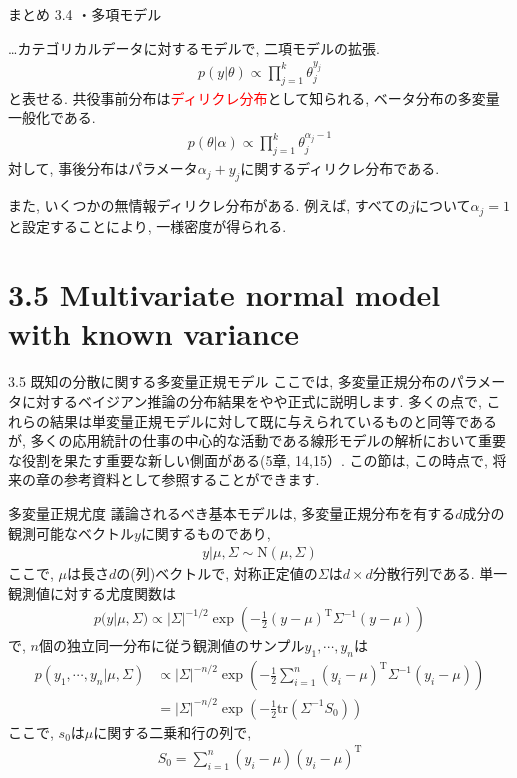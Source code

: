 \documentclass[10pt,dvipdfmx,a4]{beamer}
\newcommand{\eq}[1]{\begin{align}#1\end{align}}
\newcommand{\eqn}[1]{\begin{align*}#1\end{align*}}
\newcommand{\tcr}[1]{\textcolor{red}{#1}}
\begin{document}
\begin{frame}[t]{まとめ 3.4}
・多項モデル

…カテゴリカルデータに対するモデルで, 二項モデルの拡張.
\eqn{p(y|\theta)\propto\prod_{j=1}^k \theta_j^{y_j}}
と表せる.
共役事前分布は\tcr{ディリクレ分布}として知られる, ベータ分布の多変量一般化である.
\eqn{p(\theta|\alpha)\propto \prod_{j=1}^k\theta_j^{\alpha_j-1}}
対して, 事後分布はパラメータ$\alpha_j+y_j$に関するディリクレ分布である.

また, いくつかの無情報ディリクレ分布がある.
例えば, すべての$j$について$\alpha_j= 1$と設定することにより, 一様密度が得られる.
\end{frame}

\section{3.5 Multivariate normal model with known variance}
\begin{frame}{3.5 既知の分散に関する多変量正規モデル}
ここでは, 多変量正規分布のパラメータに対するベイジアン推論の分布結果をやや正式に説明します.
多くの点で, これらの結果は単変量正規モデルに対して既に与えられているものと同等であるが, 多くの応用統計の仕事の中心的な活動である線形モデルの解析において重要な役割を果たす重要な新しい側面がある(5章, 14,15）.
この節は, この時点で, 将来の章の参考資料として参照することができます.
\end{frame}


\begin{frame}{多変量正規尤度}
議論されるべき基本モデルは, 多変量正規分布を有する$d$成分の観測可能なベクトル$y$に関するものであり,
\eq{y|\mu, \Sigma\sim\text{N}(\mu,\Sigma)}
ここで, $\mu$は長さ$d$の(列)ベクトルで, 対称正定値の$\Sigma$は$d\times d$分散行列である.
単一観測値に対する尤度関数は
\eqn{p(y|\mu,\Sigma)\propto |\Sigma|^{-1/2}\exp \left(-\tfrac{1}{2}(y-\mu)^{\mathrm{T}}\Sigma^{-1}(y-\mu)\right)}
で, $n$個の独立同一分布に従う観測値のサンプル$y_1,\cdots,y_n$は
\eq{p(y_1,\cdots,y_n|\mu,\Sigma)&\propto|\Sigma|^{-n/2} \exp\left(-\tfrac{1}{2}\sum_{i=1}^n(y_i-\mu)^{\mathrm{T}}\Sigma^{-1}(y_i-\mu)\right)\nonumber\\
&=|\Sigma|^{-n/2}\exp \left(-\tfrac{1}{2}\text{tr}(\Sigma^{-1}S_0)\right)}
ここで, $s_0$は$\mu$に関する二乗和行の列で,
\eq{S_0=\sum_{i=1}^n(y_i-\mu)(y_i-\mu)^{\mathrm{T}}}
\end{frame}
\end{document}

